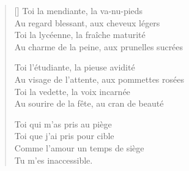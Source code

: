 \newpage

\settowidth{\versewidth}{Au charme de la peine, aux prunelles sucrées}
\begin{verse}[\versewidth]
Toi la mendiante, la va-nu-pieds \\
Au regard blessant, aux cheveux légers \\
Toi la lycéenne, la fraîche maturité \\
Au charme de la peine, aux prunelles sucrées

Toi l'étudiante, la pieuse avidité \\
Au visage de l'attente, aux pommettes rosées \\
Toi la vedette, la voix incarnée \\
Au sourire de la fête, au cran de beauté

Toi qui m'as pris au piège \\
Toi que j'ai pris pour cible \\
Comme l'amour un temps de siège \\
Tu m'es inaccessible.
\end{verse}





\newpage

